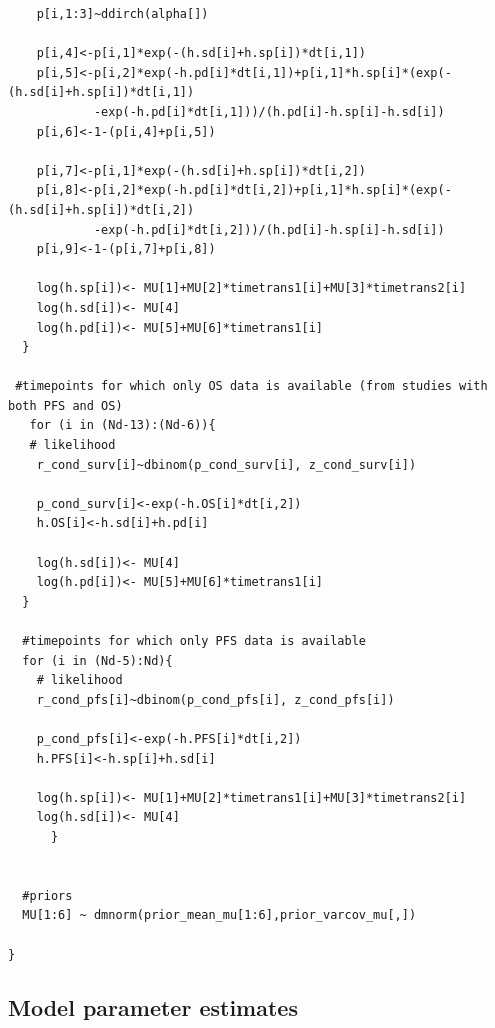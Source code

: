 \documentclass[11pt,final,fleqn]{article}\usepackage[]{graphicx}\usepackage[]{color}
\theoremstyle{plain}
\begin{document}
\begin{appendices}
\begin{verbatim}
    p[i,1:3]~ddirch(alpha[])
    
    p[i,4]<-p[i,1]*exp(-(h.sd[i]+h.sp[i])*dt[i,1])
    p[i,5]<-p[i,2]*exp(-h.pd[i]*dt[i,1])+p[i,1]*h.sp[i]*(exp(-(h.sd[i]+h.sp[i])*dt[i,1])
    		-exp(-h.pd[i]*dt[i,1]))/(h.pd[i]-h.sp[i]-h.sd[i])
    p[i,6]<-1-(p[i,4]+p[i,5])
    
    p[i,7]<-p[i,1]*exp(-(h.sd[i]+h.sp[i])*dt[i,2])
    p[i,8]<-p[i,2]*exp(-h.pd[i]*dt[i,2])+p[i,1]*h.sp[i]*(exp(-(h.sd[i]+h.sp[i])*dt[i,2])
    		-exp(-h.pd[i]*dt[i,2]))/(h.pd[i]-h.sp[i]-h.sd[i])
    p[i,9]<-1-(p[i,7]+p[i,8])
    
    log(h.sp[i])<- MU[1]+MU[2]*timetrans1[i]+MU[3]*timetrans2[i] 
    log(h.sd[i])<- MU[4] 
    log(h.pd[i])<- MU[5]+MU[6]*timetrans1[i]
  }
  
 #timepoints for which only OS data is available (from studies with both PFS and OS)
   for (i in (Nd-13):(Nd-6)){
   # likelihood
    r_cond_surv[i]~dbinom(p_cond_surv[i], z_cond_surv[i]) 
    
    p_cond_surv[i]<-exp(-h.OS[i]*dt[i,2])
    h.OS[i]<-h.sd[i]+h.pd[i]
    
    log(h.sd[i])<- MU[4]
    log(h.pd[i])<- MU[5]+MU[6]*timetrans1[i]
  }
    
  #timepoints for which only PFS data is available 
  for (i in (Nd-5):Nd){
    # likelihood
    r_cond_pfs[i]~dbinom(p_cond_pfs[i], z_cond_pfs[i]) 
    
    p_cond_pfs[i]<-exp(-h.PFS[i]*dt[i,2])
    h.PFS[i]<-h.sp[i]+h.sd[i]
    
    log(h.sp[i])<- MU[1]+MU[2]*timetrans1[i]+MU[3]*timetrans2[i] 
    log(h.sd[i])<- MU[4] 
      }
  
  
  #priors
  MU[1:6] ~ dmnorm(prior_mean_mu[1:6],prior_varcov_mu[,]) 

}

\end{verbatim}

\subsection{Model parameter estimates}


\end{appendices}
\end{document}
